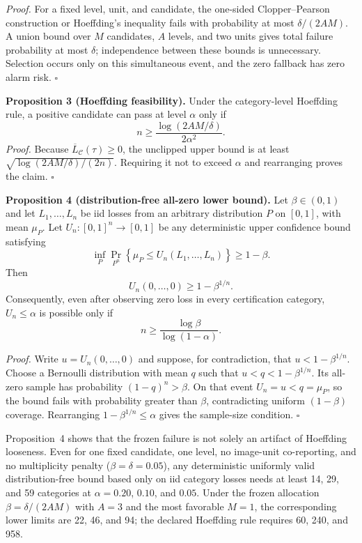 \noindent\emph{Proof.} For a fixed level, unit, and candidate, the one-sided Clopper--Pearson construction or Hoeffding's inequality fails with probability at most $\delta/(2AM)$. A union bound over $M$ candidates, $A$ levels, and two units gives total failure probability at most $\delta$; independence between these bounds is unnecessary. Selection occurs only on this simultaneous event, and the zero fallback has zero alarm risk. \hfill$\square$

\noindent\textbf{Proposition 3 (Hoeffding feasibility).} Under the category-level Hoeffding rule, a positive candidate can pass at level $\alpha$ only if
\begin{equation}\label{eq:sc3r-feasibility}
    n\geq\frac{\log(2AM/\delta)}{2\alpha^2}.
\end{equation}
\noindent\emph{Proof.} Because $\overline{L}_{\mathcal C}(\tau)\geq0$, the unclipped upper bound is at least $\sqrt{\log(2AM/\delta)/(2n)}$. Requiring it not to exceed $\alpha$ and rearranging proves the claim. \hfill$\square$

\noindent\textbf{Proposition 4 (distribution-free all-zero lower bound).}
Let $\beta\in(0,1)$ and let $L_1,\ldots,L_n$ be iid losses from an arbitrary distribution $P$ on $[0,1]$, with mean $\mu_P$. Let $U_n:[0,1]^n\to[0,1]$ be any deterministic upper confidence bound satisfying
\[
    \inf_{P}\Pr_{P^n}\!\left\{\mu_P\leq U_n(L_1,\ldots,L_n)\right\}\geq1-\beta.
\]
Then
\begin{equation}\label{eq:distribution-free-feasibility}
    U_n(0,\ldots,0)\geq1-\beta^{1/n}.
\end{equation}
Consequently, even after observing zero loss in every certification category, $U_n\leq\alpha$ is possible only if
\[
    n\geq\frac{\log\beta}{\log(1-\alpha)}.
\]

\noindent\emph{Proof.}
Write $u=U_n(0,\ldots,0)$ and suppose, for contradiction, that $u<1-\beta^{1/n}$. Choose a Bernoulli distribution with mean $q$ such that $u<q<1-\beta^{1/n}$. Its all-zero sample has probability $(1-q)^n>\beta$. On that event $U_n=u<q=\mu_P$, so the bound fails with probability greater than $\beta$, contradicting uniform $(1-\beta)$ coverage. Rearranging $1-\beta^{1/n}\leq\alpha$ gives the sample-size condition. \hfill$\square$

Proposition~4 shows that the frozen failure is not solely an artifact of Hoeffding looseness. Even for one fixed candidate, one level, no image-unit co-reporting, and no multiplicity penalty ($\beta=\delta=0.05$), any deterministic uniformly valid distribution-free bound based only on iid category losses needs at least 14, 29, and 59 categories at $\alpha=0.20$, $0.10$, and $0.05$. Under the frozen allocation $\beta=\delta/(2AM)$ with $A=3$ and the most favorable $M=1$, the corresponding lower limits are 22, 46, and 94; the declared Hoeffding rule requires 60, 240, and 958.

